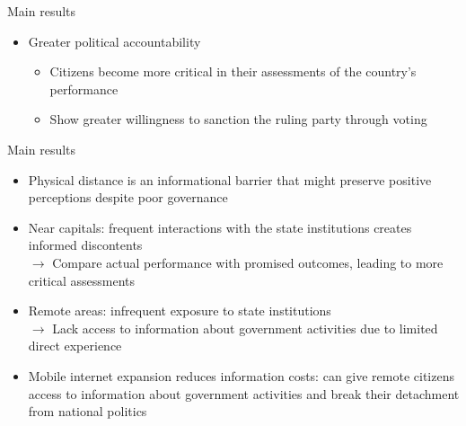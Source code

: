 \documentclass[10pt]{beamer}
\begin{document}
\begin{frame}{Main results}
\begin{enumerate}
\begin{itemize}
                \item Greater political accountability
                \begin{itemize}\setlength\itemsep{1em}

                \item Citizens become more critical in their assessments of the country's performance
                \item Show greater willingness to sanction the ruling party through voting  
            \end{itemize}
            \end{itemize}
        \end{enumerate}
    \vspace{0.5em}
\end{frame}

\begin{frame}{Main results}
    \begin{itemize}\setlength\itemsep{1em}

        \item Physical distance is an informational barrier that might preserve positive perceptions despite poor governance
        \item Near capitals: frequent interactions with the state institutions creates informed discontents\\
        $\rightarrow$ Compare actual performance with promised outcomes, leading to more critical assessments
        \item Remote areas: infrequent exposure to state institutions\\
        $\rightarrow$ Lack access to information about government activities due to limited direct experience 
        \item Mobile internet expansion reduces information costs: can give remote citizens access to information about government activities and break their detachment from national politics
    \end{itemize}
\end{frame}
\end{document}
